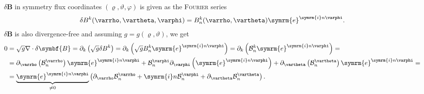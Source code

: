 \documentclass[a4paper, twoside, 10pt, english]{article}
\numberwithin{equation}{section}
\let\temp\varrho
\let\varrho\rho
\let\rho\temp
\let\temp\vartheta
\let\vartheta\theta
\let\theta\temp
\let\temp\varphi
\let\varphi\phi
\let\phi\temp
\let\vec\symbf
\newcommand*\divg{\ensuremath{\nabla \cdot}}
\newcommand*\e{\ensuremath{\symrm{e}}}  %
\newcommand*\im{\ensuremath{\symrm{i}}}  %
\newcommand*\Bpert{\ensuremath{\delta \vec{B}}}  %
\begin{document}
$\Bpert$ in symmetry flux coordinates $(\rho, \theta, \phi)$ is given as the \textsc{Fourier} series
\begin{gather}
  \delta B^{k} (\rho, \theta, \phi) = B_{n}^{k}(\rho, \theta) \e^{\im n \phi}.
\end{gather}
$\Bpert$ is also divergence-free and assuming $g = g(\rho, \theta)$, we get
\begin{align}
  0 &= \sqrt{g} \divg \Bpert = \partial_{k} \left( \sqrt{g} \delta B^{k} \right) = \partial_{k} \left( \sqrt{g} B_{n}^{k} \e^{\im n \phi} \right) = \partial_{k} \left( \mathcal{B}_{n}^{k} \e^{\im n \phi} \right) = \\
    &= \partial_{\rho} \left( \mathcal{B}_{n}^{\rho} \right) \e^{\im n \phi} + \mathcal{B}_{n}^{\phi} \partial_{\phi} \left( \e^{\im n \phi} \right) + \partial_{\theta} \left( \mathcal{B}_{n}^{\theta} \right) \e^{\im n \phi} = \\
    &= \underbrace{\e^{\im n \phi}}_{\neq 0} \left( \partial_{\rho} \mathcal{B}_{n}^{\rho} + \im n \mathcal{B}_{n}^{\phi} + \partial_{\theta} \mathcal{B}_{n}^{\theta} \right).
\end{align}

\printbibliography
\end{document}
